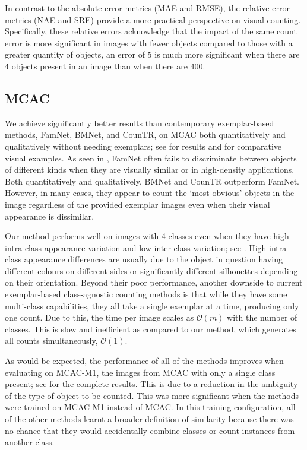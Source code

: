 \documentclass[../thesis.tex]{subfiles}
\begin{document}
In contrast to the absolute error metrics (MAE and RMSE), the relative error metrics (NAE and SRE) provide a more practical perspective on visual counting. Specifically, these relative errors acknowledge that the impact of the same count error is more significant in images with fewer objects compared to those with a greater quantity of objects, \eg an error of 5 is much more significant when there are 4 objects present in an image than when there are 400.

\subsection{MCAC}
We achieve significantly better results than contemporary exemplar-based methods, FamNet, BMNet, and CounTR, on MCAC both quantitatively and qualitatively without needing exemplars; see  for results and  for comparative visual examples.
As seen in , FamNet often fails to discriminate between objects of different kinds when they are visually similar or in high-density applications.
Both quantitatively and qualitatively, BMNet and CounTR outperform FamNet. However, in many cases, they appear to count the `most obvious' objects in the image regardless of the provided exemplar images even when their visual appearance is dissimilar.

Our method performs well on images with 4 classes even when they have high intra-class appearance variation and low inter-class variation; see . High intra-class appearance differences are usually due to the object in question having different colours on different sides or significantly different silhouettes depending on their orientation.
Beyond their poor performance, another downside to current exemplar-based class-agnostic counting methods is that while they have some multi-class capabilities, they all take a single exemplar at a time, producing only one count. Due to this, the time per image scales as $\mathcal{O}(m)$ with the number of classes. This is slow and inefficient as compared to our method, which generates all counts simultaneously, $\mathcal{O}(1)$.

As would be expected, the performance of all of the methods improves when evaluating on MCAC-M1, the images from MCAC with only a single class present; see  for the complete results. 
This is due to a reduction in the ambiguity of the type of object to be counted. 
This was more significant when the methods were trained on MCAC-M1 instead of MCAC. 
In this training configuration, all of the other methods learnt a broader definition of similarity because there was no chance that they would accidentally combine classes or count instances from another class.
\end{document}
